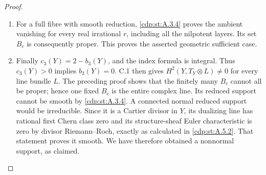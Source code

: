 \begin{proof}
\begin{enumerate}[label={$\langle1\rangle$\arabic*.},leftmargin=*]
\item For a full fibre with smooth reduction, \ref{cdp:st:A.3.4} proves the ambient vanishing for every real irrational $r$, including all the nilpotent layers. Its set $B_c$ is consequently proper. This proves the asserted geometric sufficient case.

\item Finally $c_3(Y)=2-b_3(Y)$, and the index formula is integral. Thus $c_3(Y)>0$ implies $b_3(Y)=0$. C.1 then gives $H^2(Y,T_Y\otimes L)\ne0$ for every line bundle $L$. The preceding proof shows that the finitely many $B_c$ cannot all be proper; hence one fixed $B_c$ is the entire complex line. Its reduced support cannot be smooth by \ref{cdp:st:A.3.4}. A connected normal reduced support would be irreducible. Since it is a Cartier divisor in $Y$, its dualizing line has rational first Chern class zero and its structure-sheaf Euler characteristic is zero by divisor Riemann--Roch, exactly as calculated in \ref{cdp:st:A.5.2}. That statement proves it smooth. We have therefore obtained a nonnormal support, as claimed.

\end{enumerate}
\end{proof}
